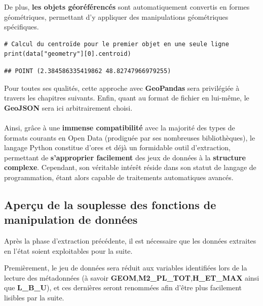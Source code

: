 \documentclass[
  11pt,
  french,
]{article}
\begin{document}
De plus, \textbf{les objets géoréférencés} sont automatiquement
convertis en formes géométriques, permettant d'y appliquer des
manipulations géométriques spécifiques.

\begin{tcolorbox}[title= Une aisance des opérations géométriques ,colback=boitecode]
\begin{lstlisting}[style=code]
# Calcul du centroïde pour le premier objet en une seule ligne
print(data["geometry"][0].centroid)\end{lstlisting}
\begin{lstlisting}[style=out]
## POINT (2.384586335419862 48.82747966979255)
\end{lstlisting}
\end{tcolorbox}

Pour toutes ses qualités, cette approche avec \textbf{GeoPandas} sera
privilégiée à travers les chapitres suivants. Enfin, quant au format de
fichier en lui-même, le \textbf{GeoJSON} sera ici arbitrairement
choisi.\\
~\\
Ainsi, grâce à une \textbf{immense compatibilité} avec la majorité des
types de formats courants en Open Data (prodiguée par ses nombreuses
bibliothèques), le langage Python constitue d'ores et déjà un formidable
outil d'extraction, permettant de \textbf{s'approprier facilement} des
jeux de données à la \textbf{structure complexe}. Cependant, son
véritable intérêt réside dans son statut de langage de programmation,
étant alors capable de traitements automatiques avancés.

\newpage

\hypertarget{aperuxe7u-de-la-souplesse-des-fonctions-de-manipulation-de-donnuxe9es}{%
\subsection{Aperçu de la souplesse des fonctions de manipulation de
données}\label{aperuxe7u-de-la-souplesse-des-fonctions-de-manipulation-de-donnuxe9es}}

Après la phase d'extraction précédente, il est nécessaire que les
données extraites en l'état soient exploitables pour la suite.

Premièrement, le jeu de données sera réduit aux variables identifiées
lors de la lecture des métadonnées (à savoir
\textbf{GEOM},\textbf{M2\_PL\_TOT},\textbf{H\_ET\_MAX} ainsi que
\textbf{L\_B\_U}), et ces dernières seront renommées afin d'être plus
facilement lisibles par la suite.
\end{document}
